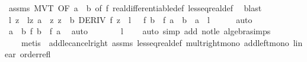 \begin{isabellebody}
\ assms\ MVT\ {\isacharbrackleft}{\kern0pt}OF\ {\isacartoucheopen}a\ {\isacharless}{\kern0pt}\ b{\isacartoucheclose}{\isacharcomma}{\kern0pt}\ of\ f{\isacharbrackright}{\kern0pt}\ real{\isacharunderscore}{\kern0pt}differentiable{\isacharunderscore}{\kern0pt}def\ less{\isacharunderscore}{\kern0pt}eq{\isacharunderscore}{\kern0pt}real{\isacharunderscore}{\kern0pt}def\ \isamarkupfalse%
\ blast\isanewline
\ \ \isamarkupfalse%
\ \isamarkupfalse%
\ l\ z\ \ lz{\isacharcolon}{\kern0pt}\ {\isachardoublequoteopen}a\ {\isacharless}{\kern0pt}\ z{\isachardoublequoteclose}\ {\isachardoublequoteopen}z\ {\isacharless}{\kern0pt}\ b{\isachardoublequoteclose}\ {\isachardoublequoteopen}DERIV\ f\ z\ {\isacharcolon}{\kern0pt}{\isachargreater}{\kern0pt}\ l{\isachardoublequoteclose}\ \ {\isacharasterisk}{\kern0pt}{\isacharasterisk}{\kern0pt}{\isacharcolon}{\kern0pt}\ {\isachardoublequoteopen}f\ b\ {\isacharminus}{\kern0pt}\ f\ a\ {\isacharequal}{\kern0pt}\ {\isacharparenleft}{\kern0pt}b\ {\isacharminus}{\kern0pt}\ a{\isacharparenright}{\kern0pt}\ {\isacharasterisk}{\kern0pt}\ l{\isachardoublequoteclose}\isanewline
\ \ \ \ \isamarkupfalse%
\ auto\isanewline
\ \ \isamarkupfalse%
\ {\isacharasterisk}{\kern0pt}\ \isamarkupfalse%
\ {\isachardoublequoteopen}a\ {\isacharless}{\kern0pt}\ b{\isachardoublequoteclose}\ {\isachardoublequoteopen}f\ b\ {\isacharless}{\kern0pt}\ f\ a{\isachardoublequoteclose}\ \isamarkupfalse%
\ auto\isanewline
\ \ \isamarkupfalse%
\ {\isacharasterisk}{\kern0pt}{\isacharasterisk}{\kern0pt}\ \isamarkupfalse%
\ {\isachardoublequoteopen}{\isasymnot}\ l\ {\isasymge}\ {}{\isachardoublequoteclose}\ \isamarkupfalse%
\ {\isacharparenleft}{\kern0pt}auto\ simp\ add{\isacharcolon}{\kern0pt}\ not{\isacharunderscore}{\kern0pt}le\ algebra{\isacharunderscore}{\kern0pt}simps{\isacharparenright}{\kern0pt}\isanewline
\ \ \ \ {\isacharparenleft}{\kern0pt}metis\ {\isacharasterisk}{\kern0pt}\ add{\isacharunderscore}{\kern0pt}le{\isacharunderscore}{\kern0pt}cancel{\isacharunderscore}{\kern0pt}right\ assms{\isacharparenleft}{\kern0pt}{}{\isacharparenright}{\kern0pt}\ less{\isacharunderscore}{\kern0pt}eq{\isacharunderscore}{\kern0pt}real{\isacharunderscore}{\kern0pt}def\ mult{\isacharunderscore}{\kern0pt}right{\isacharunderscore}{\kern0pt}mono\ add{\isacharunderscore}{\kern0pt}left{\isacharunderscore}{\kern0pt}mono\ linear\ order{\isacharunderscore}{\kern0pt}refl{\isacharparenright}{\kern0pt}\isanewline

\end{isabellebody}
